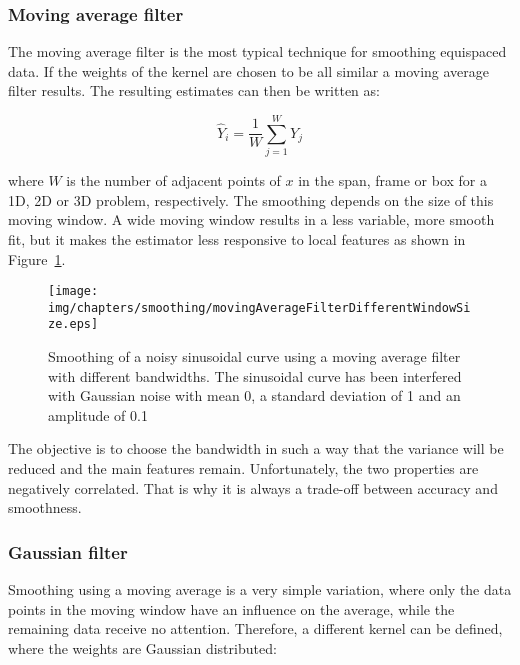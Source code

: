 
\subsubsection{Moving average filter}
The moving average filter is the most typical technique for smoothing equispaced data. If the weights of the kernel are chosen to be all similar a moving average filter results. The resulting estimates can then be written as:

\begin{equation}
	\hat{Y}_{i} = \frac{1}{W}\sum_{j=1}^{W}Y_{j} 
\label{eq:movingAverageKernel}
\end{equation}  

where $W$ is the number of adjacent points of $x$ in the span, frame or box for a 1D, 2D or 3D problem, respectively. The smoothing depends on the size of this moving window. A wide moving window results in a less variable, more smooth fit, but it makes the estimator less responsive to local features as shown in Figure~\ref{img:movingAverage}.

\begin{figure}[htb]
   \centering   
   \texttt{[image: img/chapters/smoothing/movingAverageFilterDifferentWindowSize.eps]}
   \caption[Moving average filter smoothing]{Smoothing of a noisy sinusoidal curve using a moving average filter with different bandwidths. The sinusoidal curve has been interfered with Gaussian noise with mean 0, a standard deviation of 1 and an amplitude of 0.1}
   \label{img:movingAverage}
\end{figure}   

The objective is to choose the bandwidth in such a way that the variance will be reduced and the main features remain. Unfortunately, the two properties are negatively correlated. That is why it is always a trade-off between accuracy and smoothness.

\subsubsection{Gaussian filter}
Smoothing using a moving average is a very simple variation, where only the data points in the moving window have an influence on the average, while the remaining data receive no attention. Therefore, a different kernel can be defined, where the weights are Gaussian distributed:

